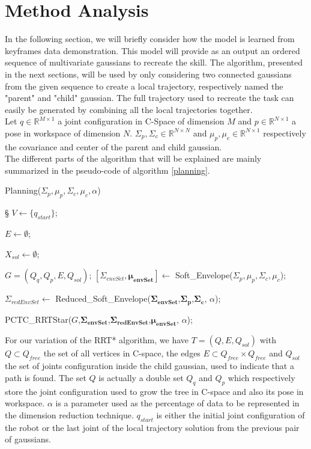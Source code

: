 \documentclass[letterpaper, 10 pt, conference]{ieeeconf}  %
\newcommand{\mb}[1]{{\boldsymbol{#1}}}
\begin{document}
\section{Method Analysis}
In the following section, we will briefly consider how the model is learned from keyframes data demonstration. This model will provide as an output an ordered sequence of multivariate gaussians to recreate the skill. The algorithm, presented in the next sections, will be used by only considering two connected gaussians from the given sequence to create a local trajectory, respectively named the "parent" and "child" gaussian. The full trajectory used to recreate the task can easily be generated by combining all the local trajectories together.
\\
Let $q \in \mathbb{R}^{M \times 1}$ a joint configuration in C-Space of dimension $M$  and $p \in \mathbb{R}^{N \times 1}$ a pose in workspace of dimension $N$. $\Sigma_{p} , \Sigma_{c} \in \mathbb{R}^{N \times N}$  and $\mu_{p} , \mu_{c} \in \mathbb{R}^{N \times 1}$ respectively the covariance and center of the parent and child gaussian.\\
The different parts of the algorithm that will be explained are mainly summarized in the pseudo-code of algorithm \ref{planning}. 
\begin{algorithm}[H]
 \caption{Planning($\Sigma_p,\mu_p,\Sigma_c,\mu_c,\alpha$)}\label{planning}

\BlankLine
\setcounter{AlgoLine}{0}§
$V \leftarrow \{
q_{start}\}$;

$E \leftarrow \emptyset$;

$X_{sol} \leftarrow \emptyset$;

$G=(Q_q,Q_p,E,Q_{sol})$;
\BlankLine
$[\Sigma_{envSet},\mb{\mu_{envSet}}] \leftarrow$ Soft\_Envelope($\Sigma_p,\mu_p,\Sigma_c,\mu_c$);

$\Sigma_{redEnvSet} \leftarrow$ Reduced\_Soft\_Envelope($\mb{\Sigma_{envSet}}$,$\mb{\Sigma_{p}}$,$\mb{\Sigma_{c}}$, $\alpha$);

\BlankLine
PCTC\_RRTStar($G$,$\mb{\Sigma_{envSet}}$,$\mb{\Sigma_{redEnvSet}}$,$\mb{\mu_{envSet}}$, $\alpha$);

\end{algorithm}
For our variation of the RRT* algorithm, we have $T=(Q,E,Q_{sol})$ with $Q \subset Q_{free}$ the set of all vertices in C-space, the edges $E \subset Q_{free} \times Q_{free}$ and $Q_{sol}$ the set of joints configuration inside the child gaussian, used to indicate that a path is found. The set $Q$ is actually a double set $Q_q$ and $Q_p$ which respectively store the joint configuration used to grow the tree in C-space and also its pose in workspace. $\alpha$ is a parameter used as the percentage of data to be represented in the dimension reduction technique. $q_{start}$ is either the initial joint configuration of the robot or the last joint of the local trajectory solution from the previous pair of gaussians. 
\end{document}
